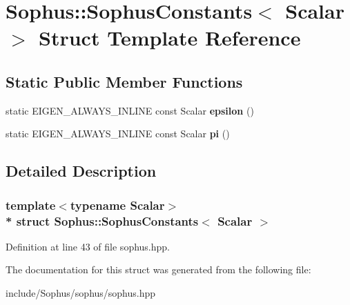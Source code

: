 \hypertarget{struct_sophus_1_1_sophus_constants}{}\section{Sophus\+:\+:Sophus\+Constants$<$ Scalar $>$ Struct Template Reference}
\label{struct_sophus_1_1_sophus_constants}
\subsection*{Static Public Member Functions}
\begin{DoxyCompactItemize}
\item 
static E\+I\+G\+E\+N\+\_\+\+A\+L\+W\+A\+Y\+S\+\_\+\+I\+N\+L\+I\+NE const Scalar {\bfseries epsilon} ()\hypertarget{struct_sophus_1_1_sophus_constants_a0c277e1fe3b69a10c26708e03c1eebc2}{}\label{struct_sophus_1_1_sophus_constants_a0c277e1fe3b69a10c26708e03c1eebc2}

\item 
static E\+I\+G\+E\+N\+\_\+\+A\+L\+W\+A\+Y\+S\+\_\+\+I\+N\+L\+I\+NE const Scalar {\bfseries pi} ()\hypertarget{struct_sophus_1_1_sophus_constants_a33e9635a1793a07a513057102a35b548}{}\label{struct_sophus_1_1_sophus_constants_a33e9635a1793a07a513057102a35b548}

\end{DoxyCompactItemize}


\subsection{Detailed Description}
\subsubsection*{template$<$typename Scalar$>$\\*
struct Sophus\+::\+Sophus\+Constants$<$ Scalar $>$}



Definition at line 43 of file sophus.\+hpp.



The documentation for this struct was generated from the following file\+:\begin{DoxyCompactItemize}
\item 
include/\+Sophus/sophus/sophus.\+hpp\end{DoxyCompactItemize}
